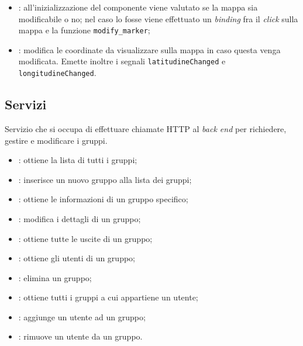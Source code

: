 \begin{itemize}
    \item {}: all'inizializzazione del componente viene valutato se la mappa sia modificabile o no; nel caso lo fosse viene effettuato un \textit{binding} fra il \textit{click} sulla mappa e la funzione \texttt{modify\_marker};
    \item {}: modifica le coordinate da visualizzare sulla mappa in caso questa venga modificata. Emette inoltre i segnali \texttt{latitudineChanged} e \texttt{longitudineChanged}.
\end{itemize}


\subsection{Servizi}
\label{par:GruppiService}
Servizio che si occupa di effettuare chiamate HTTP al \textit{back end} per richiedere, gestire e modificare i gruppi.

\begin{itemize}
    \item {}: ottiene la lista di tutti i gruppi;
    \item {}: inserisce un nuovo gruppo alla lista dei gruppi;
    \item {}: ottiene le informazioni di un gruppo specifico;
    \item {}: modifica i dettagli di un gruppo;
    \item {}: ottiene tutte le uscite di un gruppo; 
    \item {}: ottiene gli utenti di un gruppo;
    \item {}: elimina un gruppo;
    \item {}: ottiene tutti i gruppi a cui appartiene un utente; 
    \item {}: aggiunge un utente ad un gruppo;  
    \item {}: rimuove un utente da un gruppo.
\end{itemize}
